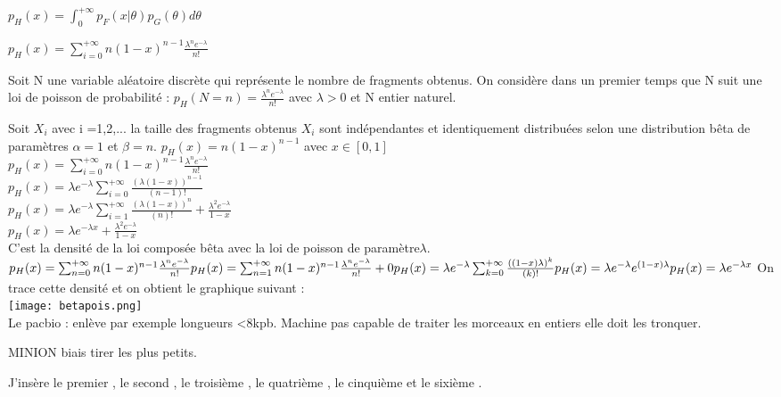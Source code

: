 \documentclass{book}
\begin{document}
$p_{H}(x) = \int_{0}^{+\infty} p_{F}(x|\theta) p_{G}(\theta)d\theta$

$p_{H}(x) = \sum_{i=0}^{+\infty}n(1-x)^{n-1}\frac{\lambda^{n}e^{-\lambda}}{n!}$

Soit N une variable aléatoire discrète qui représente le nombre de fragments obtenus.
On considère dans un premier temps que N suit une loi de poisson de probabilité : 
$p_{H}(N=n) =\frac{\lambda^{n}e^{-\lambda}}{n!}$
avec $\lambda >0 $ et N entier naturel.

Soit $X_i$ avec i =1,2,... la taille des fragments obtenus 
$X_i$ sont indépendantes et identiquement distribuées selon une distribution bêta de paramètres $\alpha = 1$ et $\beta=n$.
$p_{H}(x) =n(1-x)^{n-1}$ avec $x\in[0,1]$\\
$p_{H}(x) = \sum_{i=0}^{+\infty}n(1-x)^{n-1}\frac{\lambda^{n}e^{-\lambda}}{n!}$\\
$p_{H}(x)= \lambda e^{-\lambda}\sum_{i=0}^{+\infty}\frac{(\lambda (1-x))^{n-1}}{(n-1)!}$ \\
$p_{H}(x)= \lambda e^{-\lambda}\sum_{i=1}^{+\infty}\frac{(\lambda (1-x))^{n}}{(n)!} + \frac{\lambda^{2}e^{-\lambda}}{1-x}$ \\
$p_{H}(x)= \lambda e^{-\lambda x} + \frac{\lambda^{2}e^{-\lambda}}{1-x}$ \\
C'est la densité de la loi composée bêta avec la loi de poisson de paramètre$\lambda$. \\
$p_{H}(x) = \sum_{n=0}^{+\infty}n(1-x)^{n-1}\frac{\lambda^{n}e^{-\lambda}}{n!} \\ p_{H}(x) = \sum_{n=1}^{+\infty}n(1-x)^{n-1}\frac{\lambda^{n}e^{-\lambda}}{n!} + 0 \\
p_{H}(x) = \lambda e^{-\lambda}\sum_{k=0}^{+\infty}\frac{((1-x)\lambda)^{k}}{(k)!} \\
p_{H}(x) = \lambda e^{-\lambda}e^{(1-x)\lambda} \\
p_{H}(x) = \lambda e^{-\lambda x}
$
On trace cette densité et on obtient le graphique suivant : \\
\texttt{[image: betapois.png]}\\

Le pacbio : enlève par exemple longueurs <8kpb. Machine pas capable de traiter les morceaux en entiers elle doit les tronquer.

MINION biais tirer les plus petits.

J'insère le premier \cite{ref}, le second \cite{ref2}, le troisième \cite{ref3}, le quatrième \cite{ref4}, le cinquième \cite{ref5} et le sixième \cite{ref6}.


\end{document}
